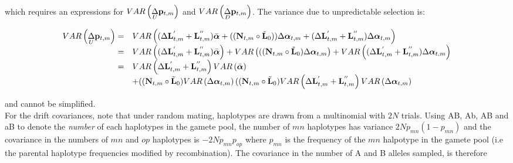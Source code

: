 \documentclass[12pt]{article}
\begin{document}
\begin{bibunit}
\begin{tiny}
\begin{equation}
\begin{array}{rl}
\end{array}
\end{equation}
\end{tiny}

which requires an expressions for $VAR\left(\underset{U}\Delta {\bf p}_{t, m}\right)$ and $VAR\left(\underset{D}\Delta {\bf p}_{t, m}\right)$. The variance due to unpredictable selection is:


\begin{tiny}
\begin{equation}
\begin{array}{rl}
VAR\left(\underset{U}\Delta {\bf p}_{t, m}\right)=&VAR\left((\Delta{\bf L}^{'}_{t, m}+{\bf L}^{''}_{t, m})\bar{\boldsymbol{\alpha}}+(({\bf N}_{t, m}\circ\tilde{\bf L}_0))\Delta\boldsymbol{\alpha}_{t,m}+(\Delta{\bf L}^{'}_{t,m}+{\bf L}^{''}_{t,m})\Delta\boldsymbol{\alpha}_{t, m}\right)\\
=&VAR\left(
(\Delta{\bf L}^{'}_{t,m}+{\bf L}^{''}_{t, m})\bar{\boldsymbol{\alpha}}\right)+VAR\left((({\bf N}_{t, m}\circ\tilde{\bf L}_0)\Delta\boldsymbol{\alpha}_{t,m}\right)+VAR\left((\Delta{\bf L}^{'}_{t, m}+{\bf L}^{''}_{t, m})\Delta\boldsymbol{\alpha}_{t,m}\right)\\

=&VAR\left(
\Delta{\bf L}^{'}_{t,m}+{\bf L}^{''}_{t,m}\right)VAR\left(\bar{\boldsymbol{\alpha}}\right)\\
&+(({\bf N}_{t, m}\circ\tilde{\bf L}_0)VAR\left(\Delta\boldsymbol{\alpha}_{t,m}\right)(({\bf N}_{t, m}\circ\tilde{\bf L}_0)VAR\left(\Delta{\bf L}^{'}_{t,m}+{\bf L}^{''}_{t,m}\right)VAR\left(\Delta\boldsymbol{\alpha}_{t,m}\right)\\
\end{array}
\end{equation}
\end{tiny}

and cannot be simplified.\\

For the drift covariances, note that under random mating, haplotypes are drawn from a multinomial with $2N$ trials. Using AB, Ab, AB and aB to denote the \emph{number} of each haplotypes in the gamete pool, the number of $mn$ haplotypes has variance $2Np_{mn}(1-p_{mn})$ and the covariance in the numbers of $mn$ and $op$ haplotypes is $-2Np_{mn}p_{op}$ where $p_{mn}$ is the frequency of the $mn$ halpotype in the gamete pool (i.e the parental haplotype frequencies modified by recombination). The covariance in the number of A and B alleles sampled, is therefore 



\end{bibunit}
\end{document}
